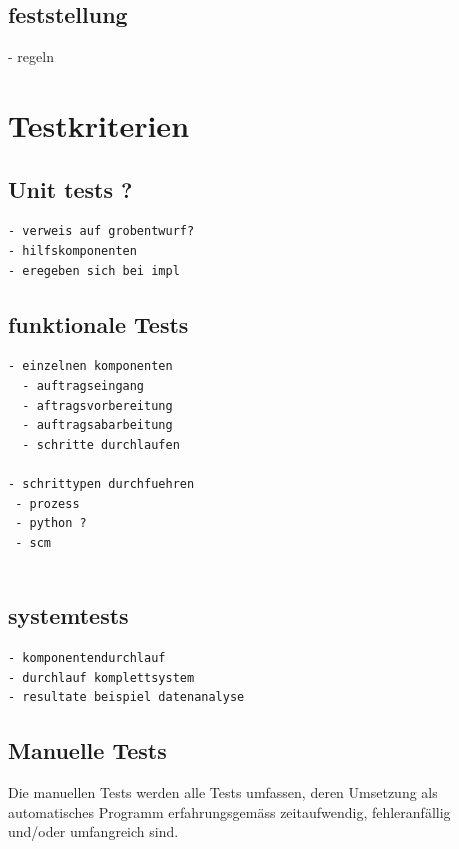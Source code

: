 \subsection{feststellung}
 - regeln


\section{Testkriterien}
\subsection{Unit tests ?}


\begin{verbatim}
- verweis auf grobentwurf?
- hilfskomponenten
- eregeben sich bei impl
\end{verbatim}

\subsection{funktionale Tests}

\begin{verbatim}
- einzelnen komponenten
  - auftragseingang
  - aftragsvorbereitung
  - auftragsabarbeitung
  - schritte durchlaufen

- schrittypen durchfuehren
 - prozess
 - python ?
 - scm


\end{verbatim}

\subsection{systemtests}

\begin{verbatim}
- komponentendurchlauf
- durchlauf komplettsystem
- resultate beispiel datenanalyse

\end{verbatim}

\subsection{Manuelle Tests}

Die manuellen Tests werden alle Tests umfassen,
deren Umsetzung als automatisches Programm erfahrungsgem\"ass zeitaufwendig,
fehleranf\"allig und/oder umfangreich sind.


